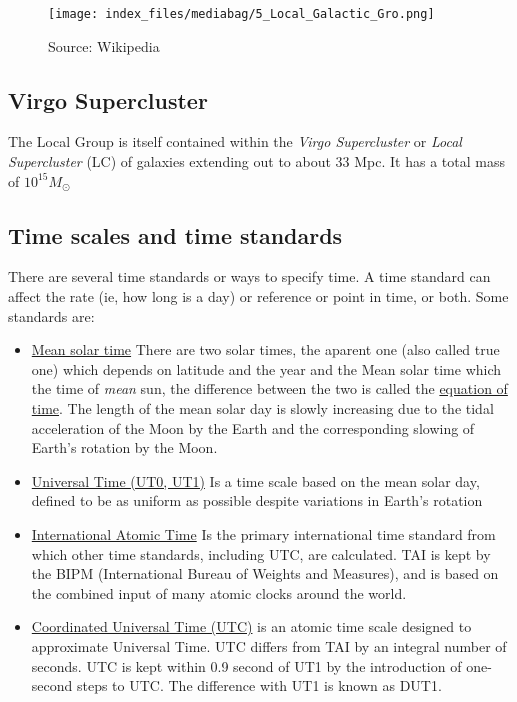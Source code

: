 \documentclass[
  letterpaper,
  DIV=11,
  numbers=noendperiod]{scrreprt}
\begin{document}
\begin{figure}[H]

{\centering \texttt{[image: index\_files/mediabag/5\_Local\_Galactic\_Gro.png]}

}

\caption{Source: Wikipedia}

\end{figure}%

\subsection{Virgo Supercluster}\label{virgo-supercluster}

The Local Group is itself contained within the \emph{Virgo Supercluster}
or \emph{Local Supercluster} (LC) of galaxies extending out to about 33
Mpc. It has a total mass of \(10^{15}M_{\odot}\)

\subsection{Time scales and time
standards}\label{time-scales-and-time-standards}

There are several time standards or ways to specify time. A time
standard can affect the rate (ie, how long is a day) or reference or
point in time, or both. Some standards are:

\begin{itemize}
\item
  \href{http://en.wikipedia.org/wiki/Solar_time\#Mean_solar_time}{Mean
  solar time} There are two solar times, the aparent one (also called
  true one) which depends on latitude and the year and the Mean solar
  time which the time of \emph{mean} sun, the difference between the two
  is called the
  \href{http://en.wikipedia.org/wiki/Solar_time\#mediaviewer/File:Equation_of_time.svg}{equation
  of time}. The length of the mean solar day is slowly increasing due to
  the tidal acceleration of the Moon by the Earth and the corresponding
  slowing of Earth's rotation by the Moon.
\item
  \href{http://en.wikipedia.org/wiki/Universal_Time}{Universal Time
  (UT0, UT1)} Is a time scale based on the mean solar day, defined to be
  as uniform as possible despite variations in Earth's rotation
\item
  \href{http://en.wikipedia.org/wiki/International_Atomic_Time}{International
  Atomic Time} Is the primary international time standard from which
  other time standards, including UTC, are calculated. TAI is kept by
  the BIPM (International Bureau of Weights and Measures), and is based
  on the combined input of many atomic clocks around the world.
\item
  \href{http://en.wikipedia.org/wiki/Coordinated_Universal_Time}{Coordinated
  Universal Time (UTC)} is an atomic time scale designed to approximate
  Universal Time. UTC differs from TAI by an integral number of seconds.
  UTC is kept within 0.9 second of UT1 by the introduction of one-second
  steps to UTC. The difference with UT1 is known as DUT1.
\end{itemize}
\end{document}

